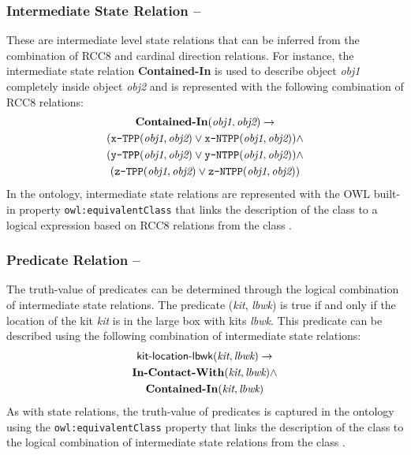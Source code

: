 \subsubsection{Intermediate State Relation --}
These are intermediate level state relations that can be inferred from the combination of RCC8 and cardinal direction relations. For  instance, the intermediate state relation \textbf{Contained-In} is used to describe object \textit{obj1} completely inside object \textit{obj2} and is represented with the following combination of RCC8 relations:
\begin{gather}
\textbf{Contained-In}(\textit{obj1}, \textit{obj2}) \rightarrow   \notag\\
(\texttt{x-TPP}(\textit{obj1}, \textit{obj2}) \vee \texttt{x-NTPP}(\textit{obj1}, \textit{obj2})) \wedge \notag\\
(\texttt{y-TPP}(\textit{obj1}, \textit{obj2}) \vee \texttt{y-NTPP}(\textit{obj1}, \textit{obj2})) \wedge \notag\\
(\texttt{z-TPP}(\textit{obj1}, \textit{obj2}) \vee \texttt{z-NTPP}(\textit{obj1}, \textit{obj2}))\notag
\end{gather}
In the ontology, intermediate state relations are represented with the OWL built-in property \texttt{owl:equivalentClass} that links the description of the class  to a logical expression based on RCC8 relations from the class .
\subsubsection{Predicate Relation --} The truth-value of predicates can be determined through the logical combination of intermediate state relations. The predicate (\textit{kit}, \textit{lbwk}) is true if and only if the location of the kit \textit{kit} is in the large box with kits \textit{lbwk}. This predicate can be described using the following combination of intermediate state relations:
\begin{gather}
\textsf{kit-location-lbwk}(\textit{kit}, \textit{lbwk}) \rightarrow   \notag\\
\textbf{In-Contact-With}(\textit{kit}, \textit{lbwk}) \wedge \notag\\
\textbf{Contained-In}(\textit{kit}, \textit{lbwk}) \notag
\end{gather}
As with state relations, the truth-value of predicates is captured in the ontology using the \texttt{owl:equivalentClass} property that links the description of the class  to the logical combination of intermediate state relations from the class .
